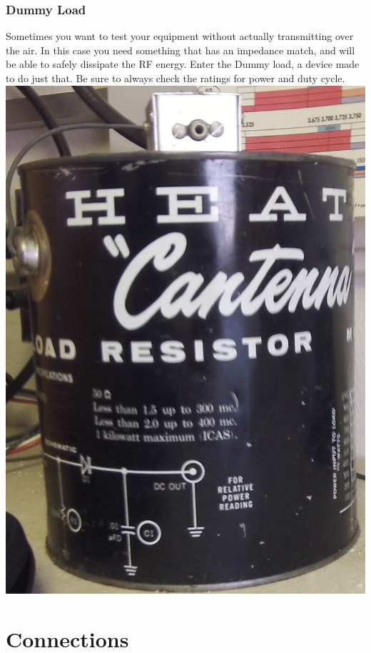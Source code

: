 \documentclass[10pt, handout]{beamer}
\begin{document}
\begin{frame}
\frametitle{Dummy Load}
Sometimes you want to test your equipment without actually transmitting over the air. In this case you need something that has an impedance match, and will be able to safely dissipate the RF energy. Enter the Dummy load, a device made to do just that. Be sure to always check the ratings for power and duty cycle.\\
\includegraphics[height=.5\textheight]{heathcantenna.jpg}
\end{frame}

\section{Connections}
\end{document}
